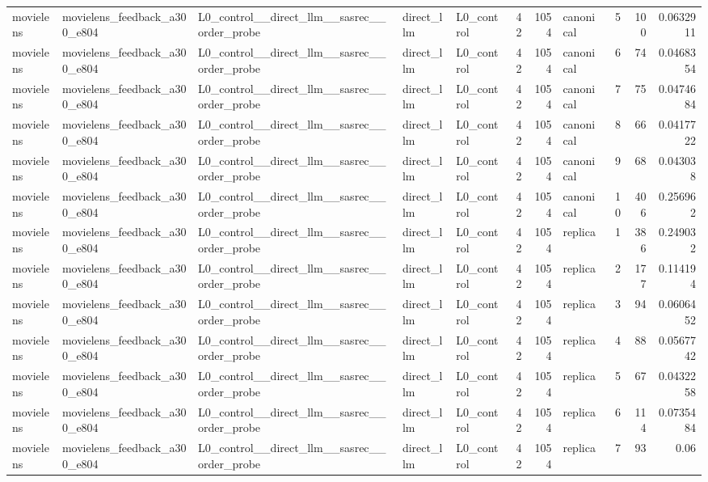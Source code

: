 \begin{table}[htbp!]
\begin{tabular}{lllllrrlrrr}
movielens & movielens\_feedback\_a300\_e804 & L0\_control\_\_direct\_llm\_\_sasrec\_\_order\_probe & direct\_llm & L0\_control & 42 & 1054 & canonical & 5 & 100 & 0.0632911 \\
movielens & movielens\_feedback\_a300\_e804 & L0\_control\_\_direct\_llm\_\_sasrec\_\_order\_probe & direct\_llm & L0\_control & 42 & 1054 & canonical & 6 & 74 & 0.0468354 \\
movielens & movielens\_feedback\_a300\_e804 & L0\_control\_\_direct\_llm\_\_sasrec\_\_order\_probe & direct\_llm & L0\_control & 42 & 1054 & canonical & 7 & 75 & 0.0474684 \\
movielens & movielens\_feedback\_a300\_e804 & L0\_control\_\_direct\_llm\_\_sasrec\_\_order\_probe & direct\_llm & L0\_control & 42 & 1054 & canonical & 8 & 66 & 0.0417722 \\
movielens & movielens\_feedback\_a300\_e804 & L0\_control\_\_direct\_llm\_\_sasrec\_\_order\_probe & direct\_llm & L0\_control & 42 & 1054 & canonical & 9 & 68 & 0.043038 \\
movielens & movielens\_feedback\_a300\_e804 & L0\_control\_\_direct\_llm\_\_sasrec\_\_order\_probe & direct\_llm & L0\_control & 42 & 1054 & canonical & 10 & 406 & 0.256962 \\
movielens & movielens\_feedback\_a300\_e804 & L0\_control\_\_direct\_llm\_\_sasrec\_\_order\_probe & direct\_llm & L0\_control & 42 & 1054 & replica & 1 & 386 & 0.249032 \\
movielens & movielens\_feedback\_a300\_e804 & L0\_control\_\_direct\_llm\_\_sasrec\_\_order\_probe & direct\_llm & L0\_control & 42 & 1054 & replica & 2 & 177 & 0.114194 \\
movielens & movielens\_feedback\_a300\_e804 & L0\_control\_\_direct\_llm\_\_sasrec\_\_order\_probe & direct\_llm & L0\_control & 42 & 1054 & replica & 3 & 94 & 0.0606452 \\
movielens & movielens\_feedback\_a300\_e804 & L0\_control\_\_direct\_llm\_\_sasrec\_\_order\_probe & direct\_llm & L0\_control & 42 & 1054 & replica & 4 & 88 & 0.0567742 \\
movielens & movielens\_feedback\_a300\_e804 & L0\_control\_\_direct\_llm\_\_sasrec\_\_order\_probe & direct\_llm & L0\_control & 42 & 1054 & replica & 5 & 67 & 0.0432258 \\
movielens & movielens\_feedback\_a300\_e804 & L0\_control\_\_direct\_llm\_\_sasrec\_\_order\_probe & direct\_llm & L0\_control & 42 & 1054 & replica & 6 & 114 & 0.0735484 \\
movielens & movielens\_feedback\_a300\_e804 & L0\_control\_\_direct\_llm\_\_sasrec\_\_order\_probe & direct\_llm & L0\_control & 42 & 1054 & replica & 7 & 93 & 0.06 \\

\end{tabular}
\end{table}

